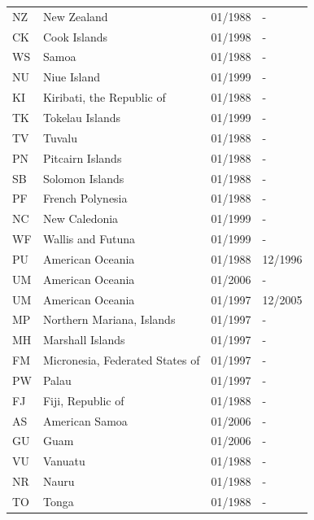 \begin{small}
\begin{longtable}{p{0.5cm}p{9cm}p{2cm}p{2cm}}
NZ	&	New Zealand	&	01/1988	&	-	\\

CK	&	Cook Islands	&	01/1998	&	-	\\

WS	&	Samoa	&	01/1988	&	-	\\

NU	&	Niue Island	&	01/1999	&	-	\\

KI	&	Kiribati, the Republic of	&	01/1988	&	-	\\

TK	&	Tokelau Islands	&	01/1999	&	-	\\

TV	&	Tuvalu	&	01/1988	&	-	\\

PN	&	Pitcairn Islands	&	01/1988	&	-	\\

SB	&	Solomon Islands	&	01/1988	&	-	\\

PF	&	French Polynesia	&	01/1988	&	-	\\

NC	&	New Caledonia	&	01/1999	&	-	\\

WF	&	Wallis and Futuna	&	01/1999	&	-	\\

PU	&	American Oceania	&	01/1988	&	12/1996	\\

UM	&	American Oceania	&	01/2006	&	-	\\

UM	&	American Oceania	&	01/1997	&	12/2005	\\

MP	&	Northern Mariana, Islands	&	01/1997	&	-	\\

MH	&	Marshall Islands	&	01/1997	&	-	\\

FM	&	Micronesia, Federated States of	&	01/1997	&	-	\\

PW	&	Palau	&	01/1997	&	-	\\

FJ	&	Fiji, Republic of	&	01/1988	&	-	\\

AS	&	American Samoa	&	01/2006	&	-	\\

GU	&	Guam	&	01/2006	&	-	\\

VU	&	Vanuatu	&	01/1988	&	-	\\

NR	&	Nauru	&	01/1988	&	-	\\

TO	&	Tonga	&	01/1988	&	-	\\

\end{longtable}
\end{small}

